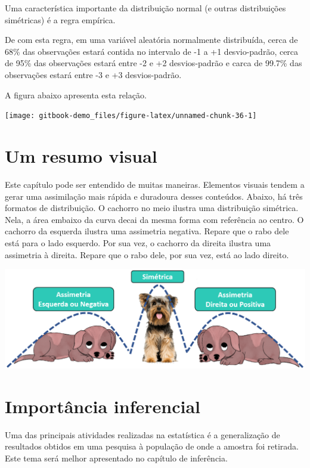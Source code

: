 \documentclass[
]{book}
\begin{document}
Uma característica importante da distribuição normal (e outras distribuições simétricas) é a regra empírica.

De com esta regra, em uma variável aleatória normalmente distribuída, cerca de 68\% das observações estará contida no intervalo de -1 a +1 desvio-padrão, cerca de 95\% das observações estará entre -2 e +2 desvios-padrão e carca de 99.7\% das observações estará entre -3 e +3 desvios-padrão.

A figura abaixo apresenta esta relação.

\begin{center}\texttt{[image: gitbook-demo\_files/figure-latex/unnamed-chunk-36-1]} \end{center}

\hypertarget{um-resumo-visual}{%
\section{Um resumo visual}\label{um-resumo-visual}}

Este capítulo pode ser entendido de muitas maneiras. Elementos visuais tendem a gerar uma assimilação mais rápida e duradoura desses conteúdos. Abaixo, há três formatos de distribuição. O cachorro no meio ilustra uma distribuição simétrica. Nela, a área embaixo da curva decai da mesma forma com referência ao centro. O cachorro da esquerda ilustra uma assimetria negativa. Repare que o rabo dele está para o lado esquerdo. Por sua vez, o cachorro da direita ilustra uma assimetria à direita. Repare que o rabo dele, por sua vez, está ao lado direito.

\includegraphics{./img/cap_desc_assimetria.png}

\hypertarget{importuxe2ncia-inferencial}{%
\section{Importância inferencial}\label{importuxe2ncia-inferencial}}

Uma das principais atividades realizadas na estatística é a generalização de resultados obtidos em uma pesquisa à população de onde a amostra foi retirada. Este tema será melhor apresentado no capítulo de inferência.
\end{document}
